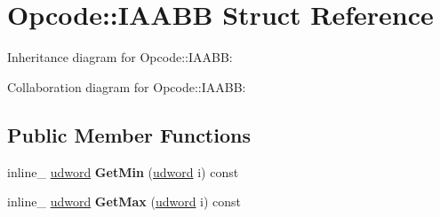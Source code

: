 \hypertarget{struct_opcode_1_1_i_a_a_b_b}{\section{Opcode\+:\+:I\+A\+A\+B\+B Struct Reference}
\label{struct_opcode_1_1_i_a_a_b_b}
}


Inheritance diagram for Opcode\+:\+:I\+A\+A\+B\+B\+:


Collaboration diagram for Opcode\+:\+:I\+A\+A\+B\+B\+:
\subsection*{Public Member Functions}
\begin{DoxyCompactItemize}
\item 
\hypertarget{struct_opcode_1_1_i_a_a_b_b_af53fde568b9834ec168a66bf8f0d167e}{inline\+\_\+ \hyperlink{_ice_types_8h_a44c6f1920ba5551225fb534f9d1a1733}{udword} {\bfseries Get\+Min} (\hyperlink{_ice_types_8h_a44c6f1920ba5551225fb534f9d1a1733}{udword} i) const }\label{struct_opcode_1_1_i_a_a_b_b_af53fde568b9834ec168a66bf8f0d167e}

\item 
\hypertarget{struct_opcode_1_1_i_a_a_b_b_a7c56d9dc1d5107a4353132e67228efba}{inline\+\_\+ \hyperlink{_ice_types_8h_a44c6f1920ba5551225fb534f9d1a1733}{udword} {\bfseries Get\+Max} (\hyperlink{_ice_types_8h_a44c6f1920ba5551225fb534f9d1a1733}{udword} i) const }\label{struct_opcode_1_1_i_a_a_b_b_a7c56d9dc1d5107a4353132e67228efba}

\end{DoxyCompactItemize}
